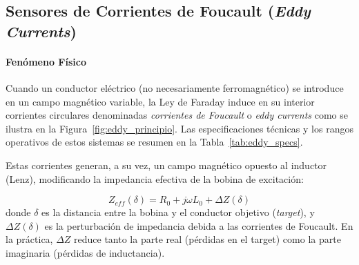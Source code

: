 
\subsection{Sensores de Corrientes de Foucault (\textit{Eddy Currents})}\label{sub:eddy}

\paragraph{Fenómeno Físico}

 Cuando un conductor eléctrico (no necesariamente ferromagnético) se introduce en un campo magnético variable, la Ley de Faraday induce en su interior corrientes circulares denominadas \emph{corrientes de Foucault} o \emph{eddy currents} como se ilustra en la Figura~\ref{fig:eddy_principio}. Las especificaciones técnicas y los rangos operativos de estos sistemas se resumen en la Tabla~\ref{tab:eddy_specs}.
 
 Estas corrientes generan, a su vez, un campo magnético opuesto al inductor (Lenz), modificando la impedancia efectiva de la bobina de excitación:

\begin{equation}\label{eq:z_eddy}
    Z_{ef\!f}(\delta) = R_0 + j\omega L_0 + \Delta Z(\delta)
\end{equation}
%
donde $\delta$ es la distancia entre la bobina y el conductor objetivo (\textit{target}), y $\Delta Z(\delta)$ es la perturbación de impedancia debida a las corrientes de Foucault. En la práctica, $\Delta Z$ reduce tanto la parte real (pérdidas en el target) como la parte imaginaria (pérdidas de inductancia). 


